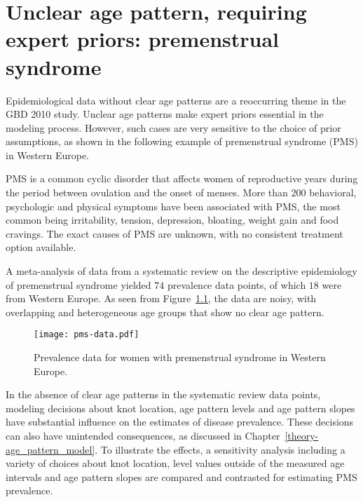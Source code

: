 \chapter{Unclear age pattern, requiring expert priors: premenstrual syndrome}
\label{applications-priors_knots_select}

Epidemiological data without clear age patterns are a reoccurring
theme in the GBD 2010 study.  Unclear age patterns make expert priors
essential in the modeling process.  However, such cases are very
sensitive to the choice of prior assumptions, as shown in the
following example of premenstrual syndrome (PMS) in Western Europe.

PMS is a common cyclic disorder that affects women of reproductive
years during the period between ovulation and the onset of menses.
More than $200$ behavioral, psychologic and physical symptoms have been
associated with PMS, the most common being irritability, tension,
depression, bloating, weight gain and food cravings.  The exact causes
of PMS are unknown, with no consistent
treatment option available. \cite{dickerson_premenstrual_2003, singh_incidence_1998,
  goodale_alleviation_1990}

A meta-analysis of data from a systematic review on the descriptive
epidemiology of premenstrual syndrome yielded $74$ prevalence
data points, of which $18$ were from Western Europe.  As seen from 
Figure~\ref{fig:app-pms_data}, the data are noisy, with overlapping and
heterogeneous age groups that show no clear age pattern.

    \begin{figure}[h]
        \begin{center}
            \texttt{[image: pms-data.pdf]}
            \caption{Prevalence data for women with premenstrual
              syndrome in Western Europe.}
        \end{center}
        \label{fig:app-pms_data}
    \end{figure}

In the absence of clear age patterns in the systematic review data
points, modeling decisions about knot location, age pattern levels
and age pattern slopes have substantial influence on the estimates of
disease prevalence.  These decisions can also have unintended
consequences, as discussed in Chapter~\ref{theory-age_pattern_model}.
To illustrate the effects, a sensitivity analysis including a variety
of choices about knot location,
level values outside of the measured age intervals and age pattern
slopes are compared and contrasted for estimating PMS prevalence.

